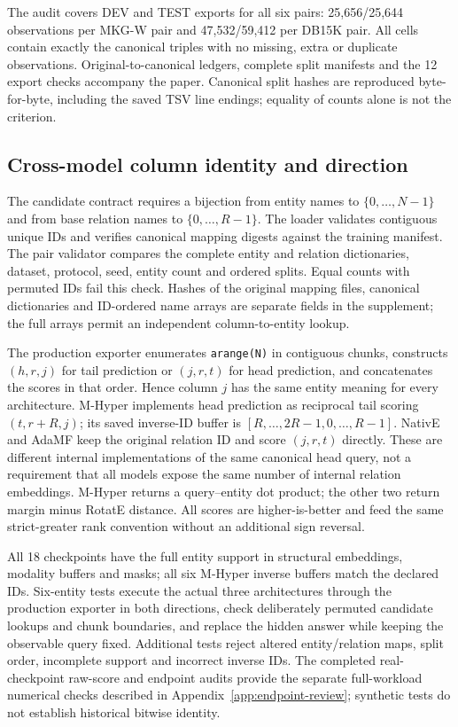 \documentclass[11pt,a4paper]{article}
\begin{document}
The audit covers DEV and TEST exports for all six pairs: 25,656/25,644 observations per MKG-W pair and 47,532/59,412 per DB15K pair. All cells contain exactly the canonical triples with no missing, extra or duplicate observations. Original-to-canonical ledgers, complete split manifests and the 12 export checks accompany the paper. Canonical split hashes are reproduced byte-for-byte, including the saved TSV line endings; equality of counts alone is not the criterion.

\subsection{Cross-model column identity and direction}
\label{app:alignment-training}

The candidate contract requires a bijection from entity names to $\{0,\ldots,N-1\}$ and from base relation names to $\{0,\ldots,R-1\}$. The loader validates contiguous unique IDs and verifies canonical mapping digests against the training manifest. The pair validator compares the complete entity and relation dictionaries, dataset, protocol, seed, entity count and ordered splits. Equal counts with permuted IDs fail this check. Hashes of the original mapping files, canonical dictionaries and ID-ordered name arrays are separate fields in the supplement; the full arrays permit an independent column-to-entity lookup.

The production exporter enumerates \texttt{arange(N)} in contiguous chunks, constructs $(h,r,j)$ for tail prediction or $(j,r,t)$ for head prediction, and concatenates the scores in that order. Hence column $j$ has the same entity meaning for every architecture. M-Hyper implements head prediction as reciprocal tail scoring $(t,r+R,j)$; its saved inverse-ID buffer is $[R,\ldots,2R-1,0,\ldots,R-1]$. NativE and AdaMF keep the original relation ID and score $(j,r,t)$ directly. These are different internal implementations of the same canonical head query, not a requirement that all models expose the same number of internal relation embeddings. M-Hyper returns a query--entity dot product; the other two return margin minus RotatE distance. All scores are higher-is-better and feed the same strict-greater rank convention without an additional sign reversal.

All 18 checkpoints have the full entity support in structural embeddings, modality buffers and masks; all six M-Hyper inverse buffers match the declared IDs. Six-entity tests execute the actual three architectures through the production exporter in both directions, check deliberately permuted candidate lookups and chunk boundaries, and replace the hidden answer while keeping the observable query fixed. Additional tests reject altered entity/relation maps, split order, incomplete support and incorrect inverse IDs. The completed real-checkpoint raw-score and endpoint audits provide the separate full-workload numerical checks described in Appendix~\ref{app:endpoint-review}; synthetic tests do not establish historical bitwise identity.
\end{document}
